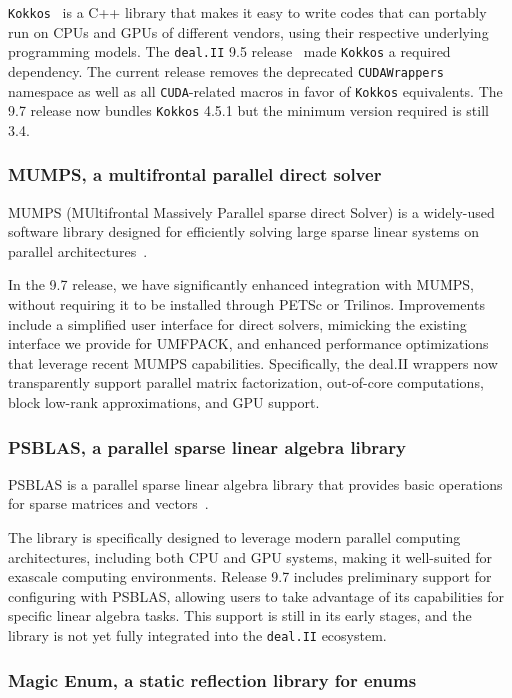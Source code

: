 \documentclass{ansarticle-preprint}
\newcommand{\specialword}[1]{\texttt{#1}}
\newcommand{\dealii}{{\specialword{deal.II}}\xspace}
\newcommand{\kokkos}{{\specialword{Kokkos}}\xspace}
\begin{document}
\kokkos~\cite{trott2022} is a C++ library that makes it easy to write codes that can
portably run on CPUs and GPUs of different vendors, using their
respective underlying programming models.
The \dealii{} 9.5 release~\cite{dealII95} made \kokkos a required
dependency. The current release removes the deprecated \texttt{CUDAWrappers} namespace as well
as all \texttt{CUDA}-related macros in favor of \kokkos
equivalents. The 9.7 release now bundles \kokkos 4.5.1 but the minimum version required is still 3.4.

\subsubsection{MUMPS, a multifrontal parallel direct solver}

MUMPS (MUltifrontal Massively Parallel sparse direct Solver) is a
widely-used software library designed for efficiently solving large sparse linear systems on parallel architectures~\cite{amestoy2001mumps}.

In the 9.7 release, we have significantly enhanced integration with MUMPS,
without requiring it to be installed through PETSc or Trilinos. Improvements
include a simplified user interface for direct solvers, mimicking the existing
interface we provide for UMFPACK, and enhanced performance optimizations that
leverage recent MUMPS capabilities. Specifically, the deal.II wrappers now
transparently support parallel matrix factorization, out-of-core computations,
block low-rank approximations, and GPU support.

\subsubsection{PSBLAS, a parallel sparse linear algebra library}

PSBLAS is a parallel sparse linear algebra library that provides basic operations for sparse matrices and vectors~\cite{Filippone2000psblas}.

The library is specifically designed to leverage modern
parallel computing architectures, including both CPU and GPU systems, making it well-suited for exascale
computing environments. Release 9.7 includes preliminary support for configuring with PSBLAS, allowing users to take advantage of its capabilities for specific linear algebra tasks. This support is still in its early stages, and the library is not yet fully integrated into the \dealii{} ecosystem.

\subsubsection{Magic Enum, a static reflection library for enums}
\end{document}

